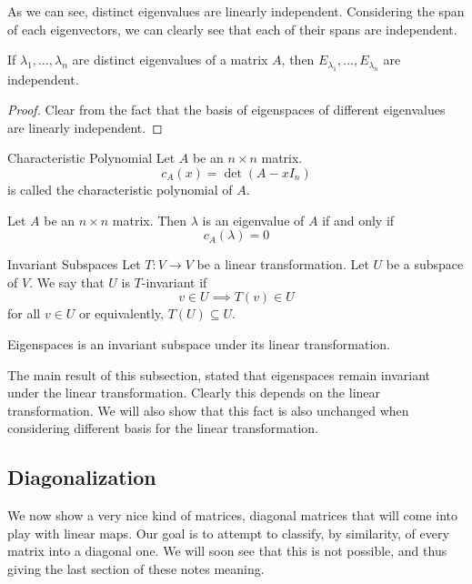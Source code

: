 \documentclass[a4paper]{article}
\begin{document}
As we can see, distinct eigenvalues are linearly independent. Considering the span of each eigenvectors, we can clearly see that each of their spans are independent. 

\begin{prp}{}{} If $\lambda_1,\dots,\lambda_n$ are distinct eigenvalues of a matrix $A$, then $E_{\lambda_1},\dots,E_{\lambda_n}$ are independent. \tcbline
\begin{proof}
Clear from the fact that the basis of eigenspaces of different eigenvalues are linearly independent. 
\end{proof}
\end{prp}

\begin{defn}{Characteristic Polynomial}{} Let $A$ be an $n\times n$ matrix. $$c_A(x)=\det(A-xI_n)$$ is called the characteristic polynomial of $A$. 
\end{defn}

\begin{prp}{}{} Let $A$ be an $n\times n$ matrix. Then $\lambda$ is an eigenvalue of $A$ if and only if $$c_A(\lambda)=0$$
\end{prp}

\begin{defn}{Invariant Subspaces}{} Let $T:V\to V$ be a linear transformation. Let $U$ be a subspace of $V$. We say that $U$ is $T$-invariant if $$v\in U\implies T(v)\in U$$ for all $v\in U$ or equivalently, $T(U)\subseteq U$. 
\end{defn}

\begin{thm}{}{} Eigenspaces is an invariant subspace under its linear transformation. 
\end{thm}

The main result of this subsection, stated that eigenspaces remain invariant under the linear transformation. Clearly this depends on the linear transformation. We will also show that this fact is also unchanged when considering different basis for the linear transformation. 

\subsection{Diagonalization}
We now show a very nice kind of matrices, diagonal matrices that will come into play with linear maps. Our goal is to attempt to classify, by similarity, of every matrix into a diagonal one. We will soon see that this is not possible, and thus giving the last section of these notes meaning. 
\end{document}
